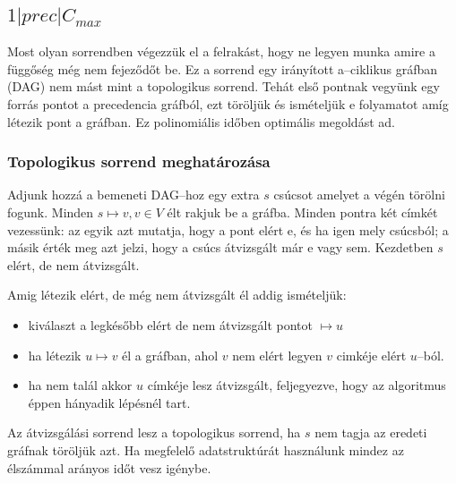 \subsection{ \texorpdfstring{$ 1|prec|C_{max} $} {1|prec|Cmax} }

Most olyan sorrendben végezzük el a felrakást, hogy ne legyen munka amire a
függőség még nem fejeződőt be. Ez a sorrend egy irányított a--ciklikus gráfban
(DAG) nem mást mint a topologikus sorrend. Tehát első pontnak vegyünk egy forrás
pontot a precedencia gráfból, ezt töröljük és ismételjük e folyamatot amíg
létezik pont a gráfban. Ez polinomiális időben optimális megoldást ad.

\subsubsection{Topologikus sorrend meghatározása}

Adjunk hozzá a bemeneti DAG--hoz egy extra $s$ csúcsot amelyet a végén törölni
fogunk. Minden $s \mapsto v, v \in V$ élt rakjuk be a gráfba. Minden pontra két
címkét vezessünk: az egyik azt mutatja, hogy a pont elért e, és ha igen mely
csúcsból; a másik érték meg azt jelzi, hogy a csúcs átvizsgált már e vagy sem.
Kezdetben $s$ elért, de nem átvizsgált.

Amig létezik elért, de még nem átvizsgált él addig ismételjük:

\begin{itemize}
	\item kiválaszt a legkésőbb elért de nem átvizsgált pontot $\mapsto u$
	\item ha létezik $u \mapsto v$ él a gráfban, ahol $v$ nem elért legyen $v$
	      cimkéje elért $u$--ból.
	\item ha nem talál akkor $u$ címkéje lesz átvizsgált, feljegyezve, hogy az
	      algoritmus éppen hányadik lépésnél tart.
\end{itemize}

Az átvizsgálási sorrend lesz a topologikus sorrend, ha $s$ nem tagja az eredeti
gráfnak töröljük azt. Ha megfelelő adatstruktúrát használunk mindez az élszámmal
arányos időt vesz igénybe.

